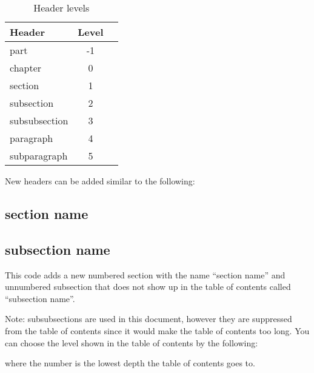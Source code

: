 \begin{table}[H]
\centering
\caption{Header levels}
\label{Tab:HeaderLevels}
\begin{tabular}{|l|*{2}{c|}}
\hline
Header        & Level \\\hline
part          & -1    \\
chapter       & 0     \\ 
section       & 1     \\ 
subsection    & 2     \\ 
subsubsection & 3     \\ 
paragraph     & 4     \\ 
subparagraph  & 5 \\\hline
\end{tabular}
\end{table}

New headers can be added similar to the following:

\begin{center}
\begin{latexcode}
\section{section name}
\subsection*{subsection name}
\end{latexcode}
\end{center}

This code adds a new numbered section with the name ``section name'' and unnumbered subsection that does not show up in the table of contents called ``subsection name''.



Note: subsubsections are used in this document, however they are suppressed from the table of contents since it would make the table of contents too long. You can choose the level shown in the table of contents by the following:

\begin{center}
\begin{latexcode}
\setcounter{tocdepth}{2}
\end{latexcode}
\end{center}

where the number is the lowest depth the table of contents goes to.



